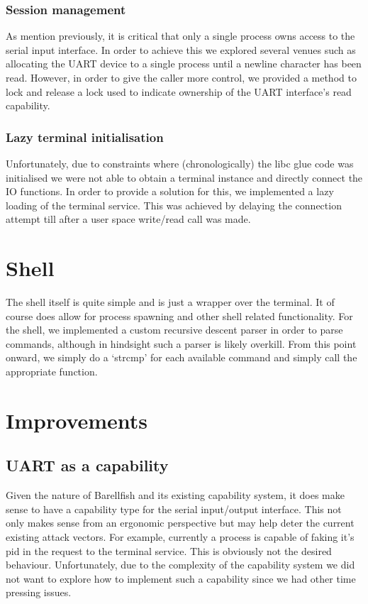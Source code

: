 \subsubsection{Session management}
\label{sec:sessions}
As mention previously, it is critical that only a single process owns access to the serial input interface. In order to achieve this we explored several venues such as allocating the UART device to a single process until a newline character has been read. However, in order to give the caller more control, we provided a method to lock and release a lock used to indicate ownership of the UART interface's read capability.

\subsubsection{Lazy terminal initialisation}
Unfortunately, due to constraints where (chronologically) the libc glue code was initialised we were not able to obtain a terminal instance and directly connect the IO functions. In order to provide a solution for this, we implemented a lazy loading of the terminal service. This was achieved by delaying the connection attempt till after a user space write/read call was made. 


\section{Shell}
The shell itself is quite simple and is just a wrapper over the terminal. It of course does allow for process spawning and other shell related functionality. For the shell, we implemented a custom recursive descent parser in order to parse commands, although in hindsight such a parser is likely overkill. From this point onward, we simply do a `strcmp' for each available command and simply call the appropriate function.  

\section{Improvements}

\subsection{UART as a capability}
Given the nature of Barellfish and its existing capability system,  it does make sense to have a capability type for the serial input/output interface. This not only makes sense from an ergonomic perspective but may help deter the current existing attack vectors. For example, currently a process is capable of faking it's pid in the request to the terminal service. This is obviously not the desired behaviour. Unfortunately, due to the complexity of the capability system we did not want to explore how to implement such a capability since we had other time pressing issues.

